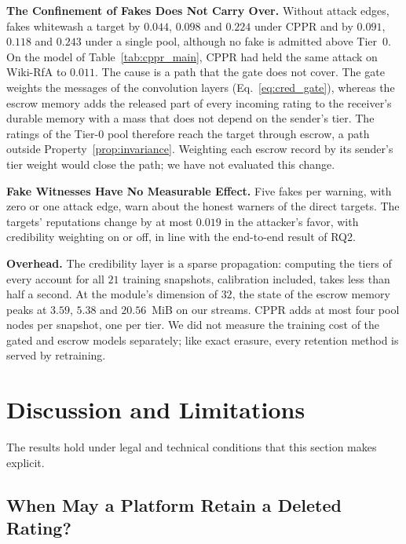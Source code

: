 \documentclass[lettersize,journal]{IEEEtran}
\begin{document}
\smallskip\noindent\textbf{The Confinement of Fakes Does Not Carry Over.}
Without attack edges, fakes whitewash a target by $0.044$, $0.098$ and $0.224$ under CPPR and by $0.091$, $0.118$ and $0.243$ under a single pool, although no fake is admitted above Tier~$0$. On the model of Table~\ref{tab:cppr_main}, CPPR had held the same attack on Wiki-RfA to $0.011$.
The cause is a path that the gate does not cover.
The gate weights the messages of the convolution layers (Eq.~\eqref{eq:cred_gate}), whereas the escrow memory adds the released part of every incoming rating to the receiver's durable memory with a mass that does not depend on the sender's tier.
The ratings of the Tier-$0$ pool therefore reach the target through escrow, a path outside Property~\ref{prop:invariance}.
Weighting each escrow record by its sender's tier weight would close the path; we have not evaluated this change.

\smallskip\noindent\textbf{Fake Witnesses Have No Measurable Effect.}
Five fakes per warning, with zero or one attack edge, warn about the honest warners of the direct targets.
The targets' reputations change by at most $0.019$ in the attacker's favor, with credibility weighting on or off, in line with the end-to-end result of RQ2.

\smallskip\noindent\textbf{Overhead.}
The credibility layer is a sparse propagation: computing the tiers of every account for all $21$ training snapshots, calibration included, takes less than half a second.
At the module's dimension of $32$, the state of the escrow memory peaks at $3.59$, $5.38$ and $20.56$~MiB on our streams.
CPPR adds at most four pool nodes per snapshot, one per tier.
We did not measure the training cost of the gated and escrow models separately; like exact erasure, every retention method is served by retraining.

\section{Discussion and Limitations}
\label{sec:discussion}

The results hold under legal and technical conditions that this section makes explicit.

\subsection{When May a Platform Retain a Deleted Rating?}
\label{subsec:gdpr}
\end{document}
